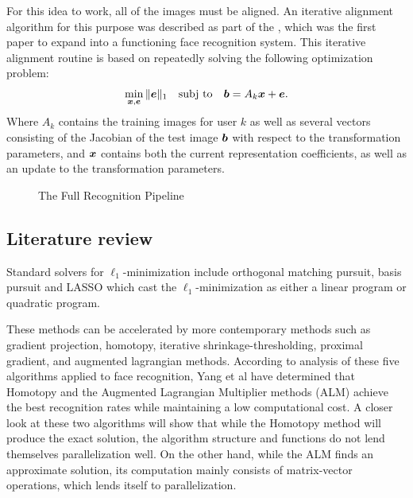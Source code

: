 \documentclass[10pt,twocolumn,letterpaper]{article}
\begin{document}
For this idea to work, all of the images must be aligned. An iterative alignment
algorithm for this purpose was described as part of the \cite{Wagner2009-CVPR}, which was
the first paper to expand \cite{Wright2009-PAMI} into a functioning face recognition system.
This iterative alignment routine is based on repeatedly solving the following optimization problem:
\begin{equation}
\min_{{\boldsymbol{x}}, \boldsymbol{e}} \|\boldsymbol{e}\|_1 \quad \textup{subj to} \quad \boldsymbol{b} = A_k {\boldsymbol{x}} + \boldsymbol{e}.
\end{equation}
Where $A_k$ contains the training images for user $k$ as well as several vectors consisting of the
Jacobian of the test image $\boldsymbol{b}$ with respect to the transformation parameters, and ${\boldsymbol{x}}$ contains
both the current representation coefficients, as well as an update to the transformation parameters.

\begin{figure}
\centering
{\tiny }
\caption{The Full Recognition Pipeline}
\label{fig:pipeline}
\end{figure}


\subsection{Literature review}

Standard solvers for $\ell_1$-minimization include orthogonal matching pursuit, basis pursuit and LASSO which cast the $\ell_1$-minimization as either a linear program or quadratic program.  

These methods can be accelerated by more contemporary methods such as gradient projection, homotopy, iterative shrinkage-thresholding, proximal gradient, and augmented lagrangian methods.  According to analysis of these five algorithms applied to face recognition, Yang et al have determined that Homotopy and the Augmented Lagrangian Multiplier methods (ALM) achieve the best recognition rates while maintaining a low computational cost.  A closer look at these two algorithms will show that while the Homotopy method will produce the exact solution, the algorithm structure and functions do not lend themselves parallelization well.  
On the other hand, while the ALM finds an approximate solution, its computation mainly consists of matrix-vector operations, which lends itself to parallelization.
\end{document}
